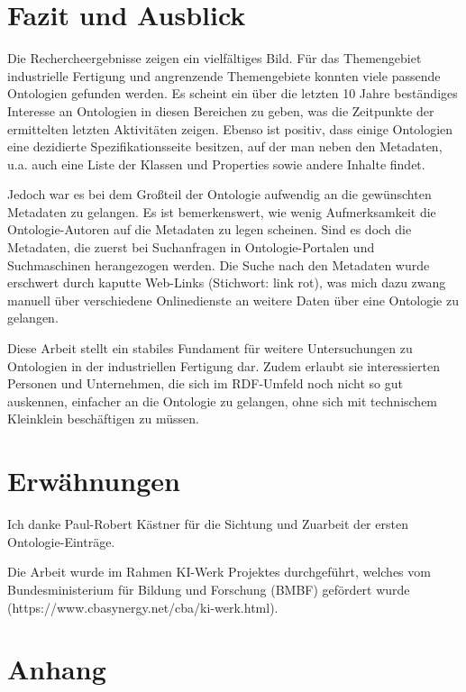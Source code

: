 \documentclass{article}
\begin{document}
\section{Fazit und Ausblick}

Die Rechercheergebnisse zeigen ein vielfältiges Bild.
Für das Themengebiet industrielle Fertigung und angrenzende Themengebiete konnten viele passende Ontologien gefunden werden.
Es scheint ein über die letzten 10 Jahre beständiges Interesse an Ontologien in diesen Bereichen zu geben, was die Zeitpunkte der ermittelten letzten Aktivitäten zeigen.
Ebenso ist positiv, dass einige Ontologien eine dezidierte Spezifikationsseite besitzen, auf der man neben den Metadaten, u.a. auch eine Liste der Klassen und Properties sowie andere Inhalte findet.

Jedoch war es bei dem Großteil der Ontologie aufwendig an die gewünschten Metadaten zu gelangen.
Es ist bemerkenswert, wie wenig Aufmerksamkeit die Ontologie-Autoren auf die Metadaten zu legen scheinen.
Sind es doch die Metadaten, die zuerst bei Suchanfragen in Ontologie-Portalen und Suchmaschinen herangezogen werden.
Die Suche nach den Metadaten wurde erschwert durch kaputte Web-Links (Stichwort: link rot), was mich dazu zwang manuell über verschiedene Onlinedienste an weitere Daten über eine Ontologie zu gelangen.

Diese Arbeit stellt ein stabiles Fundament für weitere Untersuchungen zu Ontologien in der industriellen Fertigung dar. Zudem erlaubt sie interessierten Personen und Unternehmen, die sich im RDF-Umfeld noch nicht so gut auskennen, einfacher an die Ontologie zu gelangen, ohne sich mit technischem Kleinklein beschäftigen zu müssen.

\section{Erwähnungen}

Ich danke Paul-Robert Kästner für die Sichtung und Zuarbeit der ersten Ontologie-Einträge.

Die Arbeit wurde im Rahmen KI-Werk Projektes durchgeführt, welches vom Bundesministerium für Bildung und Forschung (BMBF) gefördert wurde (https://www.cbasynergy.net/cba/ki-werk.html).

\newpage

\section{Anhang}
\end{document}
